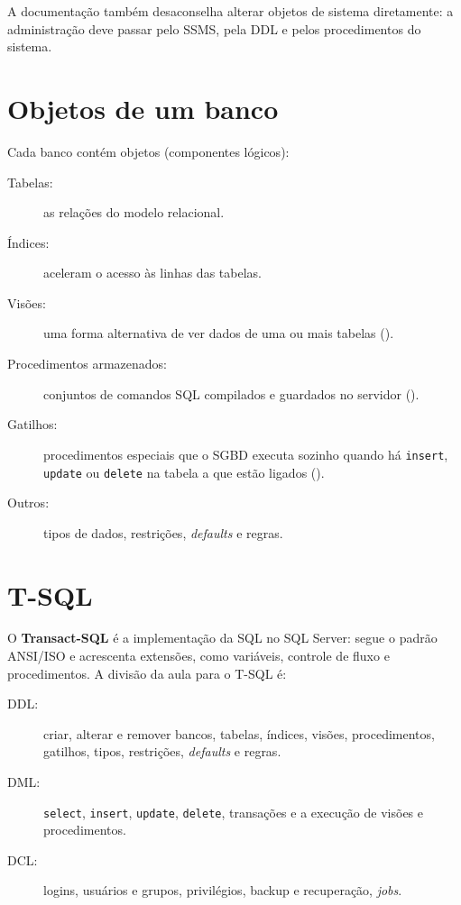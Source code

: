 A documentação também desaconselha alterar objetos de sistema
diretamente: a administração deve passar pelo SSMS, pela DDL e pelos
procedimentos do sistema.

\section{Objetos de um banco}

Cada banco contém objetos (componentes lógicos):

\begin{description}
	\item[Tabelas:] as relações do modelo relacional.
	\item[Índices:] aceleram o acesso às linhas das tabelas.
	\item[Visões:] uma forma alternativa de ver dados de uma ou mais
	tabelas ().
	\item[Procedimentos armazenados:] conjuntos de comandos SQL compilados
	e guardados no servidor ().
	\item[Gatilhos:] procedimentos especiais que o SGBD executa sozinho
	quando há \texttt{insert}, \texttt{update} ou \texttt{delete} na tabela
	a que estão ligados ().
	\item[Outros:] tipos de dados, restrições, \emph{defaults} e regras.
\end{description}

\section{T-SQL}

O \textbf{Transact-SQL} é a implementação da SQL no SQL
Server: segue o padrão ANSI/ISO e acrescenta extensões, como variáveis,
controle de fluxo e procedimentos. A divisão da aula para o T-SQL é:

\begin{description}
	\item[DDL:] criar, alterar e remover bancos, tabelas, índices, visões,
	procedimentos, gatilhos, tipos, restrições, \emph{defaults} e regras.
	\item[DML:] \texttt{select}, \texttt{insert}, \texttt{update},
	\texttt{delete}, transações e a execução de visões e procedimentos.
	\item[DCL:] logins, usuários e grupos, privilégios, backup e
	recuperação, \emph{jobs}.
\end{description}


